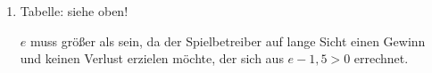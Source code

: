 \begin{langesbeispiel}
{\begin{enumerate}
	Eine kumulierte Verteilungsfunktion entsteht durch Summenbildung der Einzelwahrscheinlichkeiten. Da die Einzelwahrscheinlichkeiten definitionsgemäß immer größer oder gleich 0 sein müssen, ist die Funktion $F$ monoton steigend. Das Maximum muss 1 sein, da die Summe aller Einzelwahrscheinlichkeiten einer Wahrscheinlichkeitsverteilung 1 ergeben muss.
	
	\item Tabelle: siehe oben!
	
	$e$ muss größer als  sein, da der Spielbetreiber auf lange Sicht einen Gewinn und keinen Verlust erzielen möchte, der sich aus $e-1,5>0$ errechnet.
\end{enumerate}}
\end{langesbeispiel}
